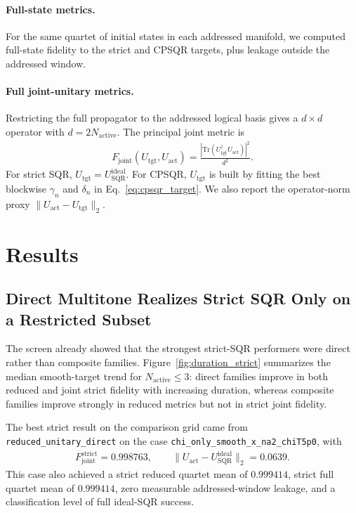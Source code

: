 \documentclass[aps,pra,twocolumn,reprint,floatfix,amsmath,amssymb]{revtex4-2}
\begin{document}
\paragraph{Full-state metrics.}
For the same quartet of initial states in each addressed manifold, we computed full-state fidelity to the strict and CPSQR targets, plus leakage outside the addressed window.

\paragraph{Full joint-unitary metrics.}
Restricting the full propagator to the addressed logical basis gives a $d\times d$ operator with $d=2N_{\mathrm{active}}$. The principal joint metric is
\begin{align}
F_{\mathrm{joint}}(U_{\mathrm{tgt}},U_{\mathrm{act}})
=
\frac{\left|\mathrm{Tr}(U_{\mathrm{tgt}}^\dagger U_{\mathrm{act}})\right|^2}{d^2}.
\label{eq:joint_process}
\end{align}
For strict SQR, $U_{\mathrm{tgt}}=U_{\mathrm{SQR}}^{\mathrm{ideal}}$. For CPSQR, $U_{\mathrm{tgt}}$ is built by fitting the best blockwise $\gamma_n$ and $\delta_n$ in Eq.~\eqref{eq:cpsqr_target}. We also report the operator-norm proxy $\lVert U_{\mathrm{act}}-U_{\mathrm{tgt}}\rVert_2$.

\section{Results}

\subsection{Direct Multitone Realizes Strict SQR Only on a Restricted Subset}
The screen already showed that the strongest strict-SQR performers were direct rather than composite families. Figure~\ref{fig:duration_strict} summarizes the median smooth-target trend for $N_{\mathrm{active}}\le 3$: direct families improve in both reduced and joint strict fidelity with increasing duration, whereas composite families improve strongly in reduced metrics but not in strict joint fidelity.

The best strict result on the comparison grid came from \texttt{reduced\_unitary\_direct} on the case \texttt{chi\_only\_smooth\_x\_na2\_chiT5p0}, with
\begin{align}
F_{\mathrm{joint}}^{\mathrm{strict}} = 0.998763,
\qquad
\lVert U_{\mathrm{act}}-U_{\mathrm{SQR}}^{\mathrm{ideal}}\rVert_2 = 0.0639.
\end{align}
This case also achieved a strict reduced quartet mean of $0.999414$, strict full quartet mean of $0.999414$, zero measurable addressed-window leakage, and a classification level of full ideal-SQR success.
\end{document}
